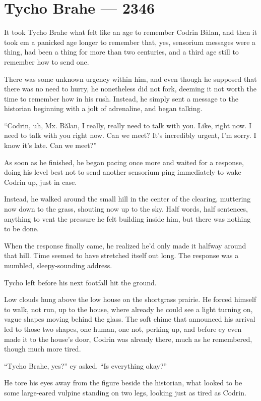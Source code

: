 \hypertarget{tycho-brahe-2346}{%
\chapter{Tycho Brahe — 2346}\label{tycho-brahe-2346}}

It took Tycho Brahe what felt like an age to remember Codrin Bălan, and then it took em a panicked age longer to remember that, yes, sensorium messages were a thing, had been a thing for more than two centuries, and a third age still to remember how to send one.

There was some unknown urgency within him, and even though he supposed that there was no need to hurry, he nonetheless did not fork, deeming it not worth the time to remember how in his rush. Instead, he simply sent a message to the historian beginning with a jolt of adrenaline, and began talking.

``Codrin, uh, Mx. Bălan, I really, really need to talk with you. Like, right now. I need to talk with you right now. Can we meet? It's incredibly urgent, I'm sorry. I know it's late. Can we meet?''

As soon as he finished, he began pacing once more and waited for a response, doing his level best not to send another sensorium ping immediately to wake Codrin up, just in case.

Instead, he walked around the small hill in the center of the clearing, muttering now down to the grass, shouting now up to the sky. Half words, half sentences, anything to vent the pressure he felt building inside him, but there was nothing to be done.

When the response finally came, he realized he'd only made it halfway around that hill. Time seemed to have stretched itself out long. The response was a mumbled, sleepy-sounding address.

Tycho left before his next footfall hit the ground.

Low clouds hung above the low house on the shortgrass prairie. He forced himself to walk, not run, up to the house, where already he could see a light turning on, vague shapes moving behind the glass. The soft chime that announced his arrival led to those two shapes, one human, one not, perking up, and before ey even made it to the house's door, Codrin was already there, much as he remembered, though much more tired.

``Tycho Brahe, yes?'' ey asked. ``Is everything okay?''

He tore his eyes away from the figure beside the historian, what looked to be some large-eared vulpine standing on two legs, looking just as tired as Codrin.

